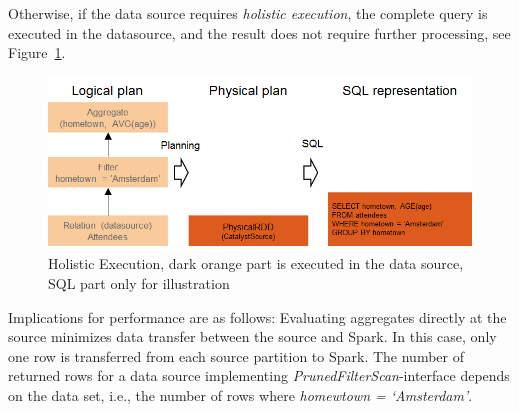 \documentclass{article}
\begin{document}
Otherwise, if the data source requires \textit{holistic execution}, the complete query is executed in the datasource, and the result does not require further processing, see Figure~\ref{fig:holisticxecution}.

\begin{figure}[htp]
\centering
  \includegraphics[width=1.0\textwidth]{images/holisticExecution.png}
  \caption{Holistic Execution, dark orange part is executed in the data source, SQL part only for illustration}
  \label{fig:holisticxecution}
\end{figure}

Implications for performance are as follows: Evaluating aggregates directly at the source minimizes data transfer between the source and Spark. In this case, only one row is transferred from each source partition to Spark. The number of returned rows for a data source implementing \textit{PrunedFilterScan}-interface depends on the data set, i.e., the number of rows where \textit{homewtown = `Amsterdam'}.
\end{document}
